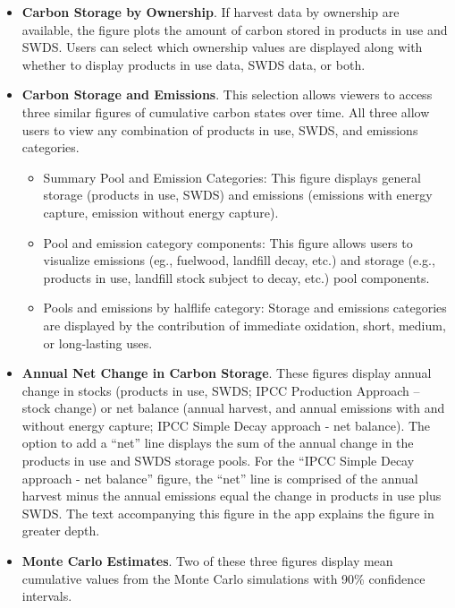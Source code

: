 \documentclass[
  openany]{book}
\providecommand{\tightlist}{%
  \setlength{\itemsep}{0pt}\setlength{\parskip}{0pt}}
\begin{document}
\begin{itemize}
\item
  \textbf{Carbon Storage by Ownership}. If harvest data by ownership are
  available, the figure plots the amount of carbon stored in products in
  use and SWDS. Users can select which ownership values are displayed
  along with whether to display products in use data, SWDS data, or
  both.\\
\item
  \textbf{Carbon Storage and Emissions}. This selection allows viewers
  to access three similar figures of cumulative carbon states over time.
  All three allow users to view any combination of products in use,
  SWDS, and emissions categories.

  \begin{itemize}
  \tightlist
  \item
    Summary Pool and Emission Categories: This figure displays general
    storage (products in use, SWDS) and emissions (emissions with energy
    capture, emission without energy capture).
  \item
    Pool and emission category components: This figure allows users to
    visualize emissions (eg., fuelwood, landfill decay, etc.) and
    storage (e.g., products in use, landfill stock subject to decay,
    etc.) pool components.
  \item
    Pools and emissions by halflife category: Storage and emissions
    categories are displayed by the contribution of immediate oxidation,
    short, medium, or long-lasting uses.\\
  \end{itemize}
\item
  \textbf{Annual Net Change in Carbon Storage}. These figures display
  annual change in stocks (products in use, SWDS; IPCC Production
  Approach -- stock change) or net balance (annual harvest, and annual
  emissions with and without energy capture; IPCC Simple Decay approach
  - net balance). The option to add a ``net'' line displays the sum of
  the annual change in the products in use and SWDS storage pools. For
  the ``IPCC Simple Decay approach - net balance'' figure, the ``net''
  line is comprised of the annual harvest minus the annual emissions
  equal the change in products in use plus SWDS. The text accompanying
  this figure in the app explains the figure in greater depth.
\item
  \textbf{Monte Carlo Estimates}. Two of these three figures display
  mean cumulative values from the Monte Carlo simulations with 90\%
  confidence intervals.


\end{itemize}
\end{document}
